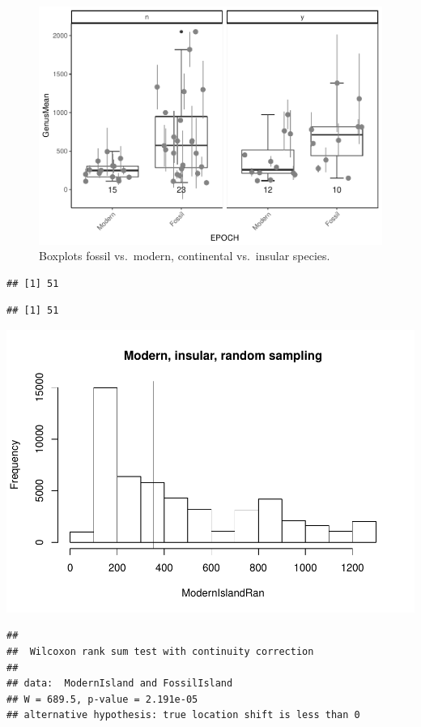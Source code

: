 \documentclass[]{article}
\begin{document}
\begin{figure}[htbp]
\centering
\includegraphics{MA_JJ_files/figure-latex/Boxplots fossil vs. modern, continental vs. insular-1.pdf}
\caption{Boxplots fossil vs.~modern, continental vs.~insular species.}
\end{figure}

\begin{verbatim}
## [1] 51
\end{verbatim}

\begin{verbatim}
## [1] 51
\end{verbatim}

\includegraphics{MA_JJ_files/figure-latex/randon sampling modern fossil, island continental-1.pdf}

\begin{verbatim}
## 
##  Wilcoxon rank sum test with continuity correction
## 
## data:  ModernIsland and FossilIsland
## W = 689.5, p-value = 2.191e-05
## alternative hypothesis: true location shift is less than 0
\end{verbatim}
\end{document}
